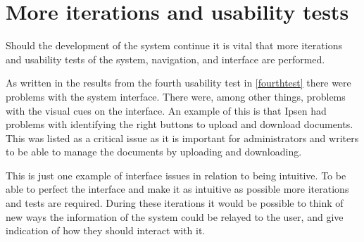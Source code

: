 \documentclass[../../master.tex]{subfiles}
\begin{document}
\section{More iterations and usability tests}

Should the development of the system continue it is vital that more iterations and usability tests of the system, navigation, and interface are performed.

As written in the results from the fourth usability test in \cref{fourthtest} there were problems with the system interface.
There were, among other things, problems with the visual cues on the interface.
An example of this is that Ipsen had problems with identifying the right buttons to upload and download documents.
This was listed as a critical issue as it is important for administrators and writers to be able to manage the documents by uploading and downloading.

This is just one example of interface issues in relation to being intuitive.
To be able to perfect the interface and make it as intuitive as possible more iterations and tests are required.
During these iterations it would be possible to think of new ways the information of the system could be relayed to the user, and give indication of how they should interact with it.
\end{document}
